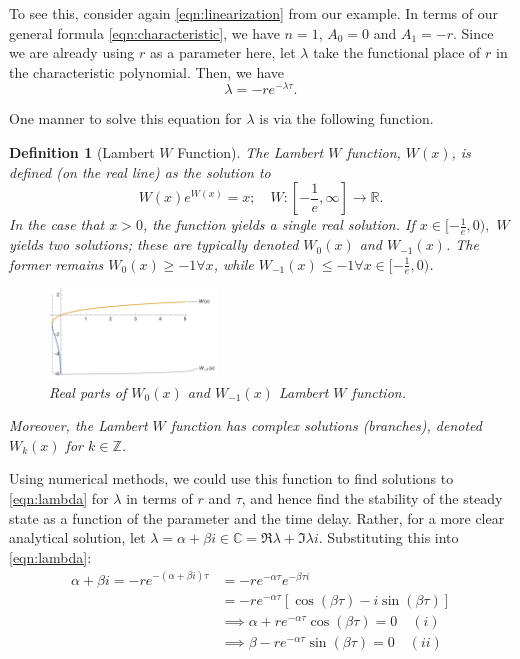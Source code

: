 \documentclass[12pt]{article}
\newtheorem{definition}{Definition}
\begin{document}
To see this, consider again \cref{eqn:linearization} from our example. In terms of our general formula \cref{eqn:characteristic}, we have $n = 1$, $A_0 = 0$ and $A_1 = -r$. Since we are already using $r$ as a parameter here, let $\lambda$ take the functional place of $r$ in the characteristic polynomial. Then, we have \begin{equation}\label{eqn:lambda}
    \lambda = -re^{-\lambda \tau}.
\end{equation}

One manner to solve this equation for $\lambda$ is via the following function.

\begin{definition}[Lambert $W$ Function]
    The Lambert $W$ function, $W(x)$, is defined (on the real line) as the solution to
    \begin{equation*}
    W(x)e^{W(x)} = x; \quad W : [- \frac{1}{e}, \infty] \to \mathbb{R}.
    \end{equation*}
    In the case that $x > 0$, the function yields a single real solution. If $x \in [-\frac{1}{e}, 0),$ $W$ yields two solutions; these are typically denoted $W_0(x)$ and $W_{-1}(x)$. The former remains $W_0(x) \geq -1 \forall x$, while $W_{-1}(x) \leq -1 \forall x \in [- \frac{1}{e}, 0)$\cite{wlamber}.
    \begin{figure}[!ht]
        \centering
        \includegraphics*[width=0.4\textwidth]{figures/wlambert.png}
        \caption{Real parts of $W_0(x)$ and $W_{-1}(x)$ Lambert $W$ function.}
    \end{figure}
    Moreover, the Lambert $W$ function has complex solutions (branches), denoted $W_k(x)$ for $k \in \mathbb{Z}$.
\end{definition}

Using numerical methods, we could use this function to find solutions to \cref{eqn:lambda} for $\lambda$ in terms of $r$ and $\tau$, and hence find the stability of the steady state as a function of the parameter and the time delay. Rather, for a more clear analytical solution, let $\lambda = \alpha + \beta i \in \mathbb{C} =\Re\lambda+ \Im\lambda i$. Substituting this into \cref{eqn:lambda}:
\begin{align*}
    \alpha + \beta i = -re^{-(\alpha + \beta i)\tau} &= -re^{-\alpha\tau}e^{-\beta\tau i}\\
    &= -re^{-\alpha \tau}\left[\cos\left(\beta \tau\right) - i \sin \left(\beta\tau \right)\right]\\
    &\implies \alpha +re^{-\alpha \tau} \cos (\beta \tau) = 0 \quad (i)\\
    &\implies \beta - re^{- \alpha \tau}\sin(\beta \tau) = 0\quad (ii)
\end{align*}
\end{document}
